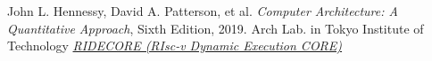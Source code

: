 \documentclass[12pt, a4paper]{article}
\theoremstyle{margin}
\begin{document}
\begin{thebibliography}{9}
	John L. Hennessy, David A. Patterson, et al.
	\emph{Computer Architecture: A Quantitative Approach},
	Sixth Edition, 2019.
  Arch Lab. in Tokyo Institute of Technology
  \emph{\href{https://github.com/ridecore/ridecore}{RIDECORE (RIsc-v Dynamic Execution CORE)}}
  
\end{thebibliography}
\end{document}
